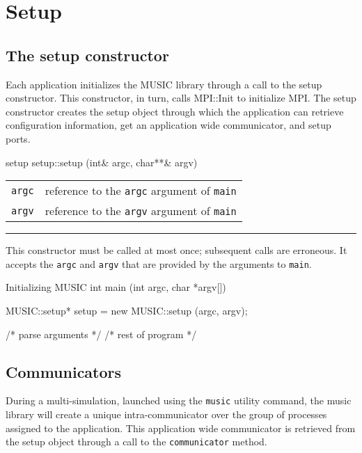 \documentclass[a4paper]{report}
\makeatletter
\newenvironment{parameters}%
{\begin{tabular}{@{\hspace{2em}}lp{0.6\textwidth}}}%
{\end{tabular}\par\vspace{1mm}\par\hrule\par\vspace{5mm}}
\makeatother
\begin{document}
\section{Setup}

\subsection{The setup constructor}

Each application initializes the MUSIC library through a call to the
setup constructor.  This constructor, in turn, calls
MPI::Init to initialize
MPI.  The setup constructor creates the setup
object through which the application can retrieve configuration
information, get an application wide communicator, and setup ports.

\begin{head}{setup}
  setup::setup (int& argc, char**& argv)
\end{head}
\begin{parameters}
  \lstinline|argc| &%
  reference to the \lstinline|argc| argument of \lstinline|main| \\
  \lstinline|argv| &%
  reference to the \lstinline|argv| argument of \lstinline|main| \\
\end{parameters}

This constructor must be called at most once; subsequent calls are
erroneous.  It accepts the \lstinline|argc| and \lstinline|argv| that are
provided by the arguments to \lstinline|main|.

\begin{code}{Initializing MUSIC}
int main (int argc, char *argv[])
{
  MUSIC::setup* setup = new MUSIC::setup (argc, argv);

  /* parse arguments */
  /* rest of program */
}
\end{code}

\subsection{Communicators}

During a multi-simulation, launched using the \lstinline|music|
utility command, the music library will create a unique
intra-communicator over the group of processes assigned to the
application.  This application wide communicator is retrieved from the
setup object through a call to the
\lstinline|communicator| method.
\end{document}

